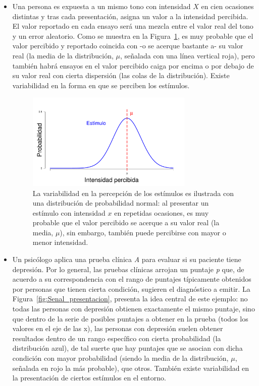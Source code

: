 \begin{itemize}
\item Una persona es expuesta a un mismo tono con intensidad $X$ en cien ocasiones distintas y tras cada presentación, asigna un valor a la intensidad percibida. El valor reportado en cada ensayo será una mezcla entre el valor real del tono y un error aleatorio. Como se muestra en la Figura~\ref{fig:Senal_percepcion}, es muy probable que el valor percibido y reportado coincida con -o se acerque bastante a- su valor real (la media de la distribución, $\mu$, señalada con una línea vertical roja), pero también habrá ensayos en el valor percibido caiga por encima o por debajo de su valor real con cierta dispersión (las colas de la distribución). Existe variabilidad en la forma en que se perciben los estímulos.

\begin{figure}[h]
\centering
\includegraphics[width=0.75\textwidth]{Figures/Signal_Perception} 
\decoRule
\caption[Variabilidad en la percepción de los estímulos]{La variabilidad en la percepción de los estímulos es ilustrada con una distribución de probabilidad normal: al presentar un estímulo con intensidad $x$ en repetidas ocasiones, es muy probable que el valor percibido se acerque a su valor real (la media, $\mu$), sin embargo, también puede percibirse con mayor o menor intensidad.}
\label{fig:Senal_percepcion}
\end{figure}

\item Un psicólogo aplica una prueba clínica \textit{A} para evaluar si su paciente tiene depresión. Por lo general, las pruebas clínicas arrojan un puntaje \textit{p} que, de acuerdo a su correspondencia con el rango de puntajes típicamente obtenidos por personas que tienen cierta condición, sugieren el diagnóstico a emitir. La Figura~\ref{fig:Senal_presentacion}, presenta la idea central de este ejemplo: no todas las personas con depresión obtienen exactamente el mismo puntaje, sino que dentro de la serie de posibles puntajes a obtener en la prueba (todos los valores en el eje de las x), las personas con depresión suelen obtener resultados dentro de un rango específico con cierta probabilidad (la distribución azul), de tal suerte que hay puntajes que se asocian con dicha condición con mayor probabilidad (siendo la media de la distribución, $\mu$, señalada en rojo la más probable), que otros. También existe variabilidad en la presentación de ciertos estímulos en el entorno.\\
\end{itemize}

